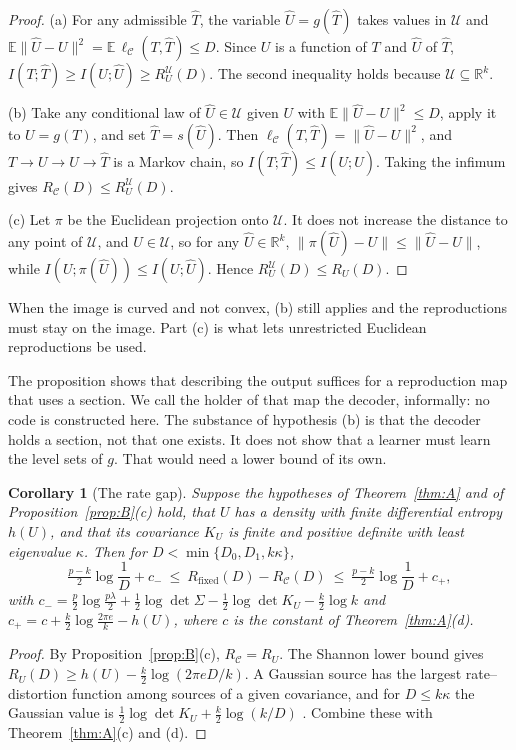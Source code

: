 \documentclass[11pt,onecolumn]{IEEEtran}
\newtheorem{corollary}[theorem]{Corollary}
\newcommand{\E}{\mathbb{E}}
\newcommand{\R}{\mathbb{R}}
\newcommand{\cU}{\mathcal U}
\newcommand{\Rfix}{R_{\mathrm{fixed}}}
\newcommand{\RC}{R_{\mathcal C}}
\begin{document}
\begin{proof}
(a) For any admissible $\hat T$, the variable $\hat U=g(\hat T)$ takes values in $\cU$
and $\E\|\hat U-U\|^2=\E\,\ell_{\mathcal C}(T,\hat T)\le D$. Since $U$ is a function of
$T$ and $\hat U$ of $\hat T$, $I(T;\hat T)\ge I(U;\hat U)\ge R_U^{\cU}(D)$. The second
inequality holds because $\cU\subseteq\R^k$.

(b) Take any conditional law of $\hat U\in\cU$ given $U$ with
$\E\|\hat U-U\|^2\le D$, apply it to $U=g(T)$, and set $\hat T=s(\hat U)$. Then
$\ell_{\mathcal C}(T,\hat T)=\|\hat U-U\|^2$, and $T\to U\to\hat U\to\hat T$ is a Markov
chain, so $I(T;\hat T)\le I(U;\hat U)$. Taking the infimum gives
$\RC(D)\le R_U^{\cU}(D)$.

(c) Let $\pi$ be the Euclidean projection onto $\cU$. It does not increase the distance
to any point of $\cU$, and $U\in\cU$, so for any $\hat U\in\R^k$,
$\|\pi(\hat U)-U\|\le\|\hat U-U\|$, while $I(U;\pi(\hat U))\le I(U;\hat U)$. Hence
$R_U^{\cU}(D)\le R_U(D)$.
\end{proof}

When the image is curved and not convex, (b) still applies and the reproductions must
stay on the image. Part (c) is what lets unrestricted Euclidean reproductions be used.

The proposition shows that describing the output suffices for a reproduction map that
uses a section. We call the holder of that map the decoder, informally: no code is
constructed here. The substance of hypothesis (b) is that the decoder holds a section,
not that one exists. It does not show that a learner must learn the level sets of $g$. That would
need a lower bound of its own.

\begin{corollary}[The rate gap]\label{cor:C}
Suppose the hypotheses of Theorem~\ref{thm:A} and of Proposition~\ref{prop:B}(c) hold,
that $U$ has a density with finite differential entropy $h(U)$, and that its covariance
$K_U$ is finite and positive definite with least eigenvalue $\kappa$. Then for
$D<\min\{D_0,D_1,k\kappa\}$,
\[
\tfrac{p-k}2\log\frac1D+c_-\ \le\ \Rfix(D)-\RC(D)\ \le\ \tfrac{p-k}2\log\frac1D+c_+ ,
\]
with
$c_-=\tfrac p2\log\tfrac{p\lambda}2+\tfrac12\log\det\Sigma-\tfrac12\log\det K_U-\tfrac k2\log k$
and
$c_+=c+\tfrac k2\log\tfrac{2\pi e}k-h(U)$, where $c$ is the constant of
Theorem~\ref{thm:A}(d).
\end{corollary}

\begin{proof}
By Proposition~\ref{prop:B}(c), $\RC=R_U$. The Shannon lower bound gives
$R_U(D)\ge h(U)-\tfrac k2\log(2\pi eD/k)$. A Gaussian source has the largest
rate--distortion function among sources of a given covariance, and for $D\le k\kappa$
the Gaussian value is $\tfrac12\log\det K_U+\tfrac k2\log(k/D)$
\cite{coverthomas}. Combine these with Theorem~\ref{thm:A}(c) and (d).
\end{proof}
\end{document}
